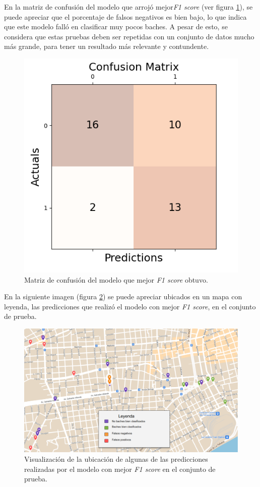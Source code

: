 	En la matriz de confusión del modelo que arrojó mejor\emph{F1 score} (ver figura \ref{fig:13}), se puede apreciar que el porcentaje de falsos
	negativos es bien bajo, lo que indica que este modelo falló en clasificar muy pocos baches. A pesar de esto, se considera que estas pruebas 
	deben ser repetidas con un conjunto de datos mucho más grande, para tener un resultado más relevante y contundente.

	\begin{figure}[htb]
		\centering
		\includegraphics[scale = 0.6]{Graphics/best_model_confusion_matrix.png}
		\caption{Matriz de confusión del modelo que mejor \emph{F1 score} obtuvo.}
		\label{fig:13}
	\end{figure}

	En la siguiente imagen (figura \ref{fig:14}) se puede apreciar ubicados en un mapa con leyenda, las predicciones que realizó el modelo con mejor 
	\emph{F1 score}, en el conjunto de prueba.

	\newpage
	\begin{figure}[htb]
		\centering
		\includegraphics[scale = 0.4]{Graphics/map_point_predictions.png}
		\caption{Visualización de la ubicación de algunas de las predicciones realizadas por el modelo con mejor \emph{F1 score} en el conjunto de prueba.}
		\label{fig:14}
	\end{figure}

